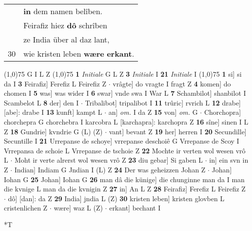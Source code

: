 \documentclass[8pt,a4paper,notitlepage]{article}
\begin{document}
\begin{table}[ht]
\begin{minipage}[t]{0.5\linewidth}
\begin{tabular}{rl}
 & \textbf{in} dem namen belîben.\\ 
 & Feirafiz hiez \textbf{dô} schrîben\\ 
 & ze India über al daz lant,\\ 
30 & wie kristen leben \textbf{wære} \textbf{erkant}.\\ 
\end{tabular}
\scriptsize
\line(1,0){75} \newline
G I L Z \newline
\line(1,0){75} \newline
\textbf{1} \textit{Initiale} G L Z  \textbf{3} \textit{Initiale} I  \textbf{21} \textit{Initiale} I  \newline
\line(1,0){75} \newline
\textbf{1} si] si da I \textbf{3} Feirafiz] Ferefiz L Feirefiz Z  $\cdot$ vrâgte] do vragte I fragt Z \textbf{4} komen] do chomen I \textbf{5} was] was wider I \textbf{6} swar] vnde swa I War L \textbf{7} Schambilot] shanbilot I Scambelot L \textbf{8} der] den I  $\cdot$ Tribalibot] tripalibot I \textbf{11} trûric] rvrich L \textbf{12} drabe] [abe]: drabe I \textbf{13} kunft] kampt L  $\cdot$ an] \textit{om.} I da Z \textbf{15} von] \textit{om.} G  $\cdot$ Chorchopra] chorchepra G chorchebra I karcobra L [karchapra]: karchopra Z \textbf{16} sîne] sinen I L Z \textbf{18} Gundrie] kvndrie G (L) (Z)  $\cdot$ vant] bevant Z \textbf{19} her] herren I \textbf{20} Secundille] Secuntille I \textbf{21} Urrepanse de schoye] vrrepanse deschoiê G Vrrepanse de Scoy I Vrrepansa de schoie L Vrrepanse de tschoie Z \textbf{22} Mochte ir verten wol wesen vrô L  $\cdot$ Moht ir verte alrerst wol wesen vrô Z \textbf{23} diu gebar] Si gaben L  $\cdot$ in] ein svn in Z  $\cdot$ Indian] Indiam G Jndian I (L) Z \textbf{24} Der was geheizzen Johan Z  $\cdot$ Johan] Iohan G \textbf{25} Johan] Iohan G \textbf{26} man dâ die künige] die chunginne man da I man die kvnige L man da die kvnigin Z \textbf{27} in] An L Z \textbf{28} Feirafiz] Ferefiz L Feirefiz Z  $\cdot$ dô] [dan]: da Z \textbf{29} India] jndia L (Z) \textbf{30} kristen leben] kristen glovben L cristenlichen Z  $\cdot$ wære] waz L (Z)  $\cdot$ erkant] bechant I \newline
\end{minipage}
\hspace{0.5cm}
\begin{minipage}[t]{0.5\linewidth}
\small
\begin{center}*T
\end{center}
\begin{tabular}{rl}

\end{tabular}
\end{minipage}
\end{table}
\end{document}
